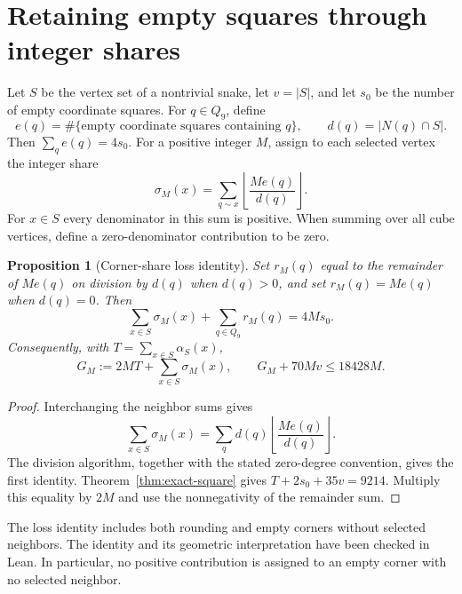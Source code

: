 \documentclass[11pt,a4paper]{article}
\newtheorem{proposition}[theorem]{Proposition}
\theoremstyle{definition}
\theoremstyle{remark}
\newcommand{\Q}{Q}
\begin{document}
\section{Retaining empty squares through integer shares}\label{sec:empty-packing}
Let $S$ be the vertex set of a nontrivial snake, let $v=|S|$, and let $s_0$ be the number of empty coordinate squares. For $q\in\Q_9$, define
\[
e(q)=\#\{\text{empty coordinate squares containing }q\},
\qquad d(q)=|N(q)\cap S|.
\]
Then $\sum_q e(q)=4s_0$. For a positive integer $M$, assign to each selected vertex the integer share
\[
\sigma_M(x)=\sum_{q\sim x}\left\lfloor\frac{M e(q)}{d(q)}\right\rfloor.
\]
For $x\in S$ every denominator in this sum is positive. When summing over all cube vertices, define a zero-denominator contribution to be zero.

\begin{proposition}[Corner-share loss identity]\label{prop:share-loss}
Set $r_M(q)$ equal to the remainder of $M e(q)$ on division by $d(q)$ when $d(q)>0$, and set $r_M(q)=M e(q)$ when $d(q)=0$. Then
\[
\sum_{x\in S}\sigma_M(x)+\sum_{q\in\Q_9}r_M(q)=4M s_0.
\]
Consequently, with $T=\sum_{x\in S}\alpha_S(x)$,
\[
G_M:=2MT+\sum_{x\in S}\sigma_M(x),
\qquad G_M+70Mv\le18428M.
\]
\end{proposition}
\begin{proof}
Interchanging the neighbor sums gives
\[
\sum_{x\in S}\sigma_M(x)=\sum_q d(q)\left\lfloor\frac{M e(q)}{d(q)}\right\rfloor.
\]
The division algorithm, together with the stated zero-degree convention, gives the first identity. Theorem~\ref{thm:exact-square} gives $T+2s_0+35v=9214$. Multiply this equality by $2M$ and use the nonnegativity of the remainder sum.
\end{proof}
The loss identity includes both rounding and empty corners without selected neighbors. The identity and its geometric interpretation have been checked in Lean. In particular, no positive contribution is assigned to an empty corner with no selected neighbor.
\end{document}
